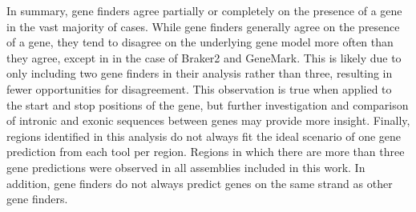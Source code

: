 In summary, gene finders agree partially or completely on the presence
of a gene in the vast majority of cases. While gene finders generally
agree on the presence of a gene, they tend to disagree on the
underlying gene model more often than they agree, except in in the
case of Braker2 and GeneMark. This is likely due to only including two
gene finders in their analysis rather than three, resulting in fewer
opportunities for disagreement. This observation is true when applied
to the start and stop positions of the gene, but further investigation
and comparison of intronic and exonic sequences between genes may
provide more insight. Finally, regions identified in this analysis do
not always fit the ideal scenario of one gene prediction from each
tool per region. Regions in which there are more than three gene
predictions were observed in all assemblies included in this work. In
addition, gene finders do not always predict genes on the same strand
as other gene finders.
